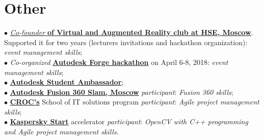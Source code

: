\documentclass[]{cv-class}
\begin{document}
\begin{minipage}[t]{0.64\textwidth}
\section{Other}
    \textcolor{bullet_col}{$\bullet$} \href{http://family.hse.ru/stud/view/391}{\textit{Co-founder} \textbf{of Virtual and Augmented Reality club at HSE, Moscow}}. Supported it for two years (lecturers invitations and hackathon organization): \textit{event management skills}; \\
    \textcolor{bullet_col}{$\bullet$} \textit{Co-organized} \href{https://www.hse.ru/ba/am/news/218387792.html}{\textbf{Autodesk Forge hackathon}} on April 6-8, 2018: \textit{event management skills}; \\
    \textcolor{bullet_col}{$\bullet$} \href{https://academy.autodesk.com/users/n1kkys}{\textbf{Autodesk Student Ambassador}}; \\
    \textcolor{bullet_col}{$\bullet$} \href{https://youtu.be/k5R8RdXaOq4}{\textbf{Autodesk Fusion 360 Slam, Moscow}} \textit{participant}: \textit{Fusion 360 skills}; \\
    \textcolor{bullet_col}{$\bullet$} \href{https://www.croc.ru/eng/}{\textbf{CROC's}} School of IT solutions program \textit{participant}: \textit{Agile project management skills}; \\
    \textcolor{bullet_col}{$\bullet$} \href{https://kasperskystart.com}{\textbf{Kaspersky Start}} accelerator \textit{participant}: \textit{OpenCV with C++ programming and Agile project management skills}.

\end{minipage}
\end{document}
